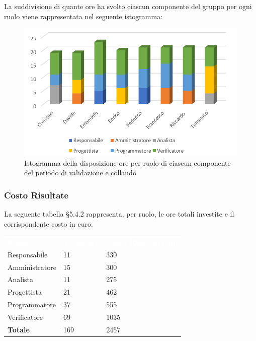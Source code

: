 La suddivisione di quante ore ha svolto ciascun componente del gruppo per ogni ruolo viene rappresentata nel seguente istogramma:

\begin{figure}[h]
	\centering
	\includegraphics[scale=2.5]{sezioni/Istogrammi/IstogrammaValidazione.png}
	\caption{Istogramma della disposizione ore per ruolo di ciascun componente del periodo di validazione e collaudo}
\end{figure}

\subsubsection{Costo Risultate}
La seguente tabella §5.4.2 rappresenta, per ruolo, le ore totali investite e il corrispondente costo in euro.
{
	\renewcommand{\arraystretch}{2}
	\centering
	\begin{longtable}{ C{3cm} C{2cm} C{4cm}}
		\textcolor{white}{\textbf{Ruolo}} & \textcolor{white}{\textbf{Totale ore}} & \textcolor{white}{\textbf{Costo Ruolo in euro}}\\	
        
        Responsabile & 11 & 330\\
        Amministratore & 15 & 300 \\
        Analista & 11 & 275\\
        Progettista & 21 & 462\\
        Programmatore & 37 & 555\\
        Verificatore & 69 & 1035\\
        \textbf{Totale} & 169 & 2457\\
		
	\end{longtable}
}

